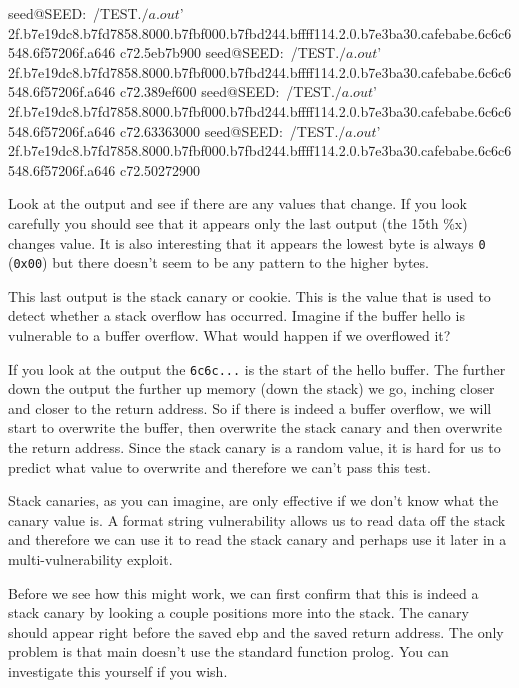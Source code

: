 \begin{code} 
seed@SEED:~/TEST$ ./a.out $'%
2f.b7e19dc8.b7fd7858.8000.b7fbf000.b7fbd244.bffff114.2.0.b7e3ba30.cafebabe.6c6c6548.6f57206f.a646 
c72.5eb7b900 
seed@SEED:~/TEST$ ./a.out $'%
2f.b7e19dc8.b7fd7858.8000.b7fbf000.b7fbd244.bffff114.2.0.b7e3ba30.cafebabe.6c6c6548.6f57206f.a646 
c72.389ef600 
seed@SEED:~/TEST$ ./a.out $'%
2f.b7e19dc8.b7fd7858.8000.b7fbf000.b7fbd244.bffff114.2.0.b7e3ba30.cafebabe.6c6c6548.6f57206f.a646 
c72.63363000 
seed@SEED:~/TEST$ ./a.out $'%
2f.b7e19dc8.b7fd7858.8000.b7fbf000.b7fbd244.bffff114.2.0.b7e3ba30.cafebabe.6c6c6548.6f57206f.a646 
c72.50272900 
\end{code}
 
Look at the output and see if there are any values that change. If you look carefully you should see that it appears only the last output (the 15th \%x) changes value. It is also interesting that it appears the lowest byte is always {\tt 0} ({\tt 0x00}) but there doesn’t seem to be any pattern to the higher bytes.  
 
This last output is the stack canary or cookie. This is the value that is used to detect whether a stack overflow has occurred. Imagine if the buffer hello is vulnerable to a buffer overflow. What would happen if we overflowed it? 
 
If you look at the output the {\tt 6c6c...} is the start of the hello buffer. The further down the output the further up memory (down the stack) we go, inching closer and closer to the return address. So if there is indeed a buffer overflow, we will start to overwrite the buffer, then overwrite the stack canary and then overwrite the return address. Since the stack canary is a random value, it is hard for us to predict what value to overwrite and therefore we can’t pass this test. 
 
Stack canaries, as you can imagine, are only effective if we don’t know what the canary value is. A format string vulnerability allows us to read data off the stack and therefore we can use it to read the stack canary and perhaps use it later in a multi-vulnerability exploit. 
 
Before we see how this might work, we can first confirm that this is indeed a stack canary by looking a couple positions more into the stack. The canary should appear right before the saved ebp and the saved return address. The only problem is that main doesn’t use the standard function prolog. You can investigate this yourself if you wish. 
 
